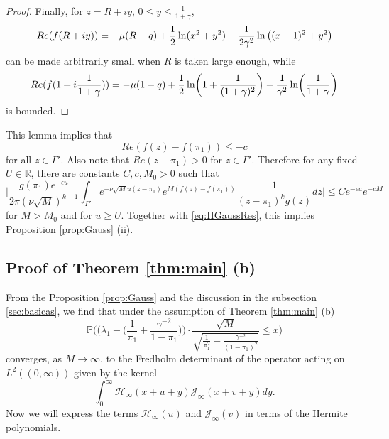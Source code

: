 \documentclass[11pt]{article}
\begin{document}
\begin{proof}
Finally, for $z= R+iy$, $0\le y\le \frac{1}{1+\gamma}$,
\begin{equation}
  Re (f(R+iy) )
  = -\mu (R-q) + \frac12 \ln (x^2+y^2) - \frac1{2\gamma^2} \ln
  \big( (x-1)^2+y^2 \bigr)
\end{equation}
can be made arbitrarily small when $R$ is taken large enough,
while
\begin{equation}
  Re ( f(1+i\frac{1}{1+\gamma}) )
  = -\mu(1-q) + \frac12 \ln \biggl( 1+\frac1{(1+\gamma)^2}
  \biggr) - \frac1{\gamma^2} \ln \biggl( \frac1{1+\gamma} \biggr)
\end{equation}
is bounded.
\end{proof}

This lemma implies that
\begin{equation}
  Re(f(z)-f(\pi_1))\le -c
\end{equation}
for all $z\in\Gamma'$. Also note that $Re(z-\pi_1)>0$ for
$z\in\Gamma'$. Therefore for any fixed $U\in \mathbb{R}$, there
are constants $C, c, M_0>0$ such that
\begin{equation}
  \biggl| \frac{g(\pi_1)e^{-\epsilon u}}{2\pi (\nu\sqrt{M})^{k-1}}
\int_{\Gamma'} e^{-\nu
  \sqrt{M}u(z-\pi_1)} e^{M(f(z)-f(\pi_1))} \frac{1}{(z-\pi_1)^kg(z)} dz \biggr|
\le C e^{-\epsilon u} e^{-cM}
\end{equation}
for $M>M_0$ and for $u\ge U$. Together with \eqref{eq:HGaussRes},
this implies Proposition \ref{prop:Gauss} (ii).

\subsection{Proof of Theorem \ref{thm:main} (b)}

From the Proposition \ref{prop:Gauss} and the discussion in the
subsection \ref{sec:basicas}, we find that under the assumption of
Theorem \ref{thm:main} (b)
\begin{equation}\label{eq:proofmainblimit}
  \mathbb{P} \biggl( \bigr( \lambda_1 - \bigl(\frac1{\pi_1}+\frac{\gamma^{-2}}{1-\pi_1}\bigr) \bigr) \cdot
  \frac{\sqrt{M}}{\sqrt{\frac1{\pi_1^2}-\frac{\gamma^{-2}}{(1-\pi_1)^2}}} \le x
  \biggr)
\end{equation}
converges, as $M\to\infty$, to the Fredholm determinant of the
operator acting on $L^2((0,\infty))$ given by the kernel
\begin{equation}\label{eq:Proofmainbtemp}
  \int_0^\infty
  \mathcal{H}_\infty(x+u+y)\mathcal{J}_\infty(x+v+y)dy.
\end{equation}
Now we will express the terms $\mathcal{H}_\infty(u)$ and
$\mathcal{J}_\infty(v)$ in terms of the Hermite polynomials.
\end{document}
